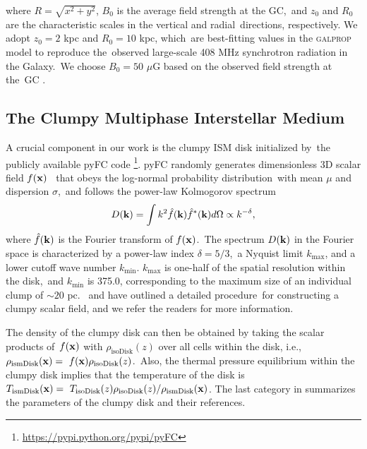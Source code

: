 \documentclass[fleqn,usenatbib,useAMS]{mnras}
\begin{document}
  where $R=\sqrt{x^{2}+y^{2}}$, $B_{0}$ is the average field strength at the GC,\
  and $z_{0}$ and $R_{0}$ are the characteristic scales in the vertical and radial\
  directions, respectively. We adopt $z_{0} = 2$ kpc and $R_{0} = 10$ kpc, which\
  are best-fitting values in the \textsc{galprop} model to reproduce the\
  observed large-scale 408 MHz synchrotron radiation in the Galaxy.\
  We choose $B_{0} = 50$ $\mu$G based on the observed field strength at the\
  GC \citep{Crocker2010}.



  \subsection{The Clumpy Multiphase Interstellar Medium}

  A crucial component in our work is the clumpy ISM disk initialized by\
  the publicly available pyFC code
  \footnote{\url{https://pypi.python.org/pypi/pyFC}}.
  pyFC randomly generates dimensionless 3D scalar field $f(\bold{x})$\ %
  that obeys the log-normal probability distribution\
  with mean $\mu$ and dispersion $\sigma$,\
  and follows the power-law Kolmogorov spectrum
  \begin{equation}
    D(\bold{k})=\int k^{2} \hat{f}(\bold{k})\hat{f}^{*}(\bold{k})d\Omega \propto k^{-\delta},
    \label{Kolmogorov-spectrum}
  \end{equation}
  where $\hat{f}(\bold{k})$ is the Fourier transform of $f(\bold{x})$.\
  The spectrum $D(\bold{k})$ in the Fourier space is characterized by a power-law index $\delta=5/3$,\
  a Nyquist limit $k_{\text{max}}$, and a lower cutoff wave number $k_{\text{min}}$.
  $k_{\text{max}}$ is one-half of the spatial resolution within the disk,\
  and $k_{\text{min}}$ is 375.0, corresponding to the maximum size of an individual clump of $\sim 20$ pc.\
  \citet{LA2002} and \citet{Wagner2012} have outlined a detailed procedure\
  for constructing a clumpy scalar field, and we refer the readers for more information.

  The density of the clumpy disk can then be obtained by taking the scalar products of\
  $f(\bold{x})$ with $\rho_{\text{isoDisk}}(z)$ over all cells within the disk, i.e.,\
  $\displaystyle\rho_{\text{ismDisk}}(\bold{x}) =\
  f(\bold{x}) \rho_{\text{isoDisk}}(z)$.\
  Also, the thermal pressure equilibrium within the clumpy disk implies that the temperature of the disk is
  $\displaystyle T_{\text{ismDisk}}(\bold{x}) =\
  T_{\text{isoDisk}}(z)\rho_{\text{isoDisk}}(z)/\rho_{\text{ismDisk}}(\bold{x})$. The last category in  summarizes the parameters of the clumpy disk and their references.
\end{document}
